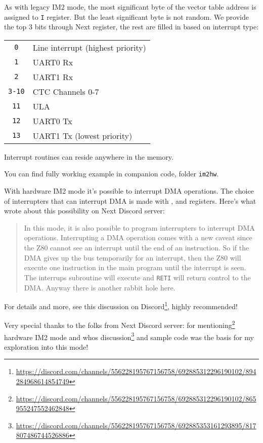 As with legacy IM2 mode, the most significant byte of the vector table address is assigned to {\tt I} register. But the least significant byte is not random. We provide the top 3 bits through  Next register, the rest are filled in based on interrupt type:

\begin{tabular}{cl}
	{\tt 0} & Line interrupt (highest priority) \\
	{\tt 1} & UART0 Rx \\
	{\tt 2} & UART1 Rx \\
	{\tt 3-10} & CTC Channels 0-7 \\
	{\tt 11} & ULA \\
	{\tt 12} & UART0 Tx \\
	{\tt 13} & UART1 Tx (lowest priority) \\
\end{tabular}

Interrupt routines can reside anywhere in the memory.

You can find fully working example in companion code, folder {\tt im2hw}.

With hardware IM2 mode it's possible to interrupt DMA operations. The choice of interrupters that can interrupt DMA is made with ,  and  registers. Here's what  wrote about this possibility on Next Discord server:

\vspace*{-1ex}
\begin{quote}
	In this mode, it is also possible to program interrupters to interrupt DMA operations. Interrupting a DMA operation comes with a new caveat since the Z80 cannot see an interrupt until the end of an instruction. So if the DMA gives up the bus temporarily for an interrupt, then the Z80 will execute one instruction in the main program until the interrupt is seen. The interrups subroutine will execute and {\tt RETI} will return control to the DMA. Anyway there is another rabbit hole here.
\end{quote}

For details and more, see this discussion on Discord\footnote{\url{https://discord.com/channels/556228195767156758/692885312296190102/894284968614854749}}, highly recommended!

Very special thanks to the folks from Next Discord server:  for mentioning\footnote{\url{https://discord.com/channels/556228195767156758/692885312296190102/865955247552462848}} hardware IM2 mode and  whos discussion\footnote{\url{https://discord.com/channels/556228195767156758/692885353161293895/817807486744526886}} and sample code was the basis for my exploration into this mode!



